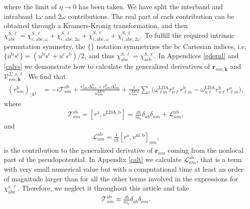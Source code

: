 \noindent where the limit of $\eta\to 0$ has been taken.
We have split the interband and intraband $1\omega$ and $2\omega$
contributions. The real part of each contribution can be obtained through
a Kramers-Kronig transformation,\cite{nicolas} and then
$\chi^{S,\ell}_{\mathrm{abc}}=\chi^{S,\ell}_{e,\mathrm{abc},\omega} 
+\chi^{S,\ell}_{e,\mathrm{abc},2\omega}+\chi^{S,\ell}_{i,\mathrm{abc},\omega}
+\chi^{S,\ell}_{i,\mathrm{abc},2\omega}
$.
To fulfill the required intrinsic permutation symmetry,\cite{rashkeevPRB98} 
the $\{\}$ notation symmetrizes the $\mathrm{b}\mathrm{c}$ Cartesian indices, i.e. 
$\{u^{\mathrm{b}}s^{\mathrm{c}}\}=(u^{\mathrm{b}}s^{\mathrm{c}}+u^{\mathrm{c}}s^{\mathrm{b}})/2$,
and thus
$\chi_{\mathrm{abc}}^{S,\ell}=\chi_{\mathrm{a}\mathrm{c}\mathrm{b}}^{S,\ell}$.
In Appendices \ref{gdernl} and \ref{calvs} we demonstrate how to calculate  
the generalized derivatives of $\mathbf{r}_{nm;\mathbf{k}}$ and
$\mathcal{V}^{\Sigma,\mathrm{a},\ell}_{nm;\mathbf{k}}$. 
We find that
\begin{align}\label{rgen.69}
(r^{\mathrm{b}}_{nm})_{;k^{\mathrm{a}}}
&=
-i\mathcal{T}^{\mathrm{a}\mathrm{b}}_{nm}
+
\frac{
r^{\mathrm{a}}_{nm}
\Delta^{\mathrm{b}}_{mn}
+r^{\mathrm{b}}_{nm}
\Delta^{\mathrm{a}}_{mn}
}
{\omega^{\mathrm{LDA}}_{nm}}
+
\frac{i}{\omega^{\mathrm{LDA}}_{nm}}
\sum_{\ell}
\bigg(
\omega^{\mathrm{LDA}}_{\ell m}
r^{\mathrm{a}}_{n\ell}
r^{\mathrm{b}}_{\ell m}
-
\omega^{\mathrm{LDA}}_{n\ell}
r^{\mathrm{b}}_{n\ell}
r^{\mathrm{a}}_{\ell m}
\bigg)
,
\end{align}
where
\begin{align}\label{tau.1}
\mathcal{T}_{nm}^{\mathrm{a}\mathrm{b}}
=
[r^{\mathrm{a}},v^{\mathrm{LDA},\mathrm{b}}]= 
\frac{i\hbar}{m_{e}}\delta_{ab}\delta_{nm} +
\mathcal{L}_{nm}^{\mathrm{a}\mathrm{b}}
,
\end{align}  
and
\begin{align}\label{tau.2}
\mathcal{L}_{nm}^{\mathrm{a}\mathrm{b}}
= \frac{1}{i\hbar}[r^{\mathrm{a}},v^{\mathrm{nl},\mathrm{b}}]_{nm}
,
\end{align}
is the contribution to the generalized derivative of $\mathbf{r}_{nm}$
coming from the nonlocal part of the pseudopotential.
In Appendix \ref{calt} we calculate
$\mathcal{L}^{\mathrm{a}\mathrm{b}}_{nm}$, that
is a term with very small numerical value but with a computational time 
at least an order of magnitude larger
than for all the other terms involved in the expressions for 
$\chi^{s,\ell}_{\mathrm{abc}}$.\cite{valerie}
Therefore, we neglect it throughout this article and take
\begin{align}\label{tau.69}
\mathcal{T}_{nm}^{\mathrm{a}\mathrm{b}}
\approx
\frac{i\hbar}{m_{e}}\delta_{ab}\delta_{nm}
.
\end{align} 
